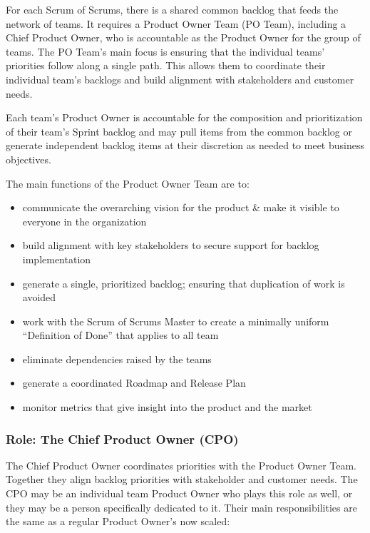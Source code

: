 \documentclass[12pt,a4paper,parskip=full]{scrartcl}
\begin{document}
For each Scrum of Scrums, there is a shared common backlog that feeds the network of teams. It requires a Product Owner Team (PO Team), including a Chief Product Owner, who is accountable as the Product Owner for the group of teams. The PO Team's main focus is ensuring that the individual teams' priorities follow along a single path. This allows them to coordinate their individual team's backlogs and build alignment with stakeholders and customer needs.


Each team's Product Owner is accountable for the composition and prioritization of their team's Sprint backlog and may pull items from the common backlog or generate independent backlog items at their discretion as needed to meet business objectives.

The main functions of the Product Owner Team are to:

\begin{itemize}
\itemsep1pt\parskip0pt
\item
  communicate the overarching vision for the product \& make it visible
  to everyone in the organization
\item
  build alignment with key stakeholders to secure support for backlog
  implementation
\item
  generate a single, prioritized backlog; ensuring that duplication of
  work is avoided
\item
  work with the Scrum of Scrums Master to create a minimally uniform
  ``Definition of Done'' that applies to all team
\item
  eliminate dependencies raised by the teams
\item
  generate a coordinated Roadmap and Release Plan
\item
  monitor metrics that give insight into the product and the market
\end{itemize}

\subsubsection{Role: The Chief Product Owner
(CPO)}\label{role-the-chief-product-owner}

The Chief Product Owner coordinates priorities with the Product Owner Team. Together they align backlog priorities with stakeholder and customer needs. The CPO may be an individual team Product Owner who plays this role as well, or they may be a person specifically dedicated to it. Their main responsibilities are the same as a regular Product Owner's now scaled:
\end{document}

